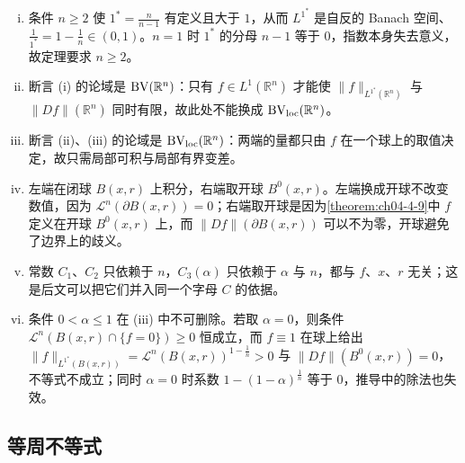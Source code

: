 ﻿\documentclass[../../main.tex]{subfiles}%
\begin{document}
\begin{remark}\label{remark:ch05-thm-5-10-条件}
\begin{enumerate}[(i)]
\item 条件 $n\geqslant2$ 使 $1^*=\frac{n}{n-1}$ 有定义且大于 $1$，从而 $L^{1^*}$ 是自反的 Banach 空间、$\frac{1}{1^*}=1-\frac1n\in(0,1)$。$n=1$ 时 $1^*$ 的分母 $n-1$ 等于 $0$，指数本身失去意义，故定理要求 $n\geqslant2$。
\item 断言 (i) 的论域是 $\mathrm{BV}(\mathbb{R}^n)$：只有 $f\in L^1(\mathbb{R}^n)$ 才能使 $\lVert f\rVert_{L^{1^*}(\mathbb{R}^n)}$ 与 $\lVert Df\rVert(\mathbb{R}^n)$ 同时有限，故此处不能换成 $\mathrm{BV}_{\mathrm{loc}}(\mathbb{R}^n)$。
\item 断言 (ii)、(iii) 的论域是 $\mathrm{BV}_{\mathrm{loc}}(\mathbb{R}^n)$：两端的量都只由 $f$ 在一个球上的取值决定，故只需局部可积与局部有界变差。
\item 左端在闭球 $B(x,r)$ 上积分，右端取开球 $B^0(x,r)$。左端换成开球不改变数值，因为 $\mathcal{L}^n(\partial B(x,r))=0$；右端取开球是因为\cref{theorem:ch04-4-9}中 $f$ 定义在开球 $B^0(x,r)$ 上，而 $\lVert Df\rVert(\partial B(x,r))$ 可以不为零，开球避免了边界上的歧义。%
\item 常数 $C_1$、$C_2$ 只依赖于 $n$，$C_3(\alpha)$ 只依赖于 $\alpha$ 与 $n$，都与 $f$、$x$、$r$ 无关；这是后文可以把它们并入同一个字母 $C$ 的依据。
\item 条件 $0<\alpha\leqslant1$ 在 (iii) 中不可删除。若取 $\alpha=0$，则条件 $\mathcal{L}^n(B(x,r)\cap\{f=0\})\geqslant0$ 恒成立，而 $f\equiv1$ 在球上给出 $\lVert f\rVert_{L^{1^*}(B(x,r))}=\mathcal{L}^n(B(x,r))^{1-\frac1n}>0$ 与 $\lVert Df\rVert(B^0(x,r))=0$，不等式不成立；同时 $\alpha=0$ 时系数 $1-(1-\alpha)^{\frac1n}$ 等于 $0$，推导中的除法也失效。
\end{enumerate}
\end{remark}

\subsection{等周不等式}\label{subsection:ch05-06-2}
\end{document}
